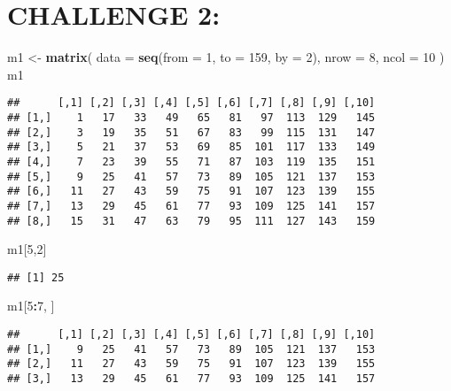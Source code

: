 \documentclass[]{article}
\newenvironment{Shaded}{\begin{snugshade}}{\end{snugshade}}
\newcommand{\KeywordTok}[1]{\textcolor[rgb]{0.13,0.29,0.53}{\textbf{#1}}}
\newcommand{\DataTypeTok}[1]{\textcolor[rgb]{0.13,0.29,0.53}{#1}}
\newcommand{\DecValTok}[1]{\textcolor[rgb]{0.00,0.00,0.81}{#1}}
\newcommand{\StringTok}[1]{\textcolor[rgb]{0.31,0.60,0.02}{#1}}
\newcommand{\OperatorTok}[1]{\textcolor[rgb]{0.81,0.36,0.00}{\textbf{#1}}}
\newcommand{\NormalTok}[1]{#1}
\begin{document}
\section{CHALLENGE 2:}\label{challenge-2}

\begin{Shaded}
\begin{Highlighting}[]
\NormalTok{m1 <-}\StringTok{ }\KeywordTok{matrix}\NormalTok{(}
  \DataTypeTok{data =} \KeywordTok{seq}\NormalTok{(}\DataTypeTok{from =} \DecValTok{1}\NormalTok{, }\DataTypeTok{to =} \DecValTok{159}\NormalTok{, }\DataTypeTok{by =} \DecValTok{2}\NormalTok{),}
  \DataTypeTok{nrow =} \DecValTok{8}\NormalTok{,}
  \DataTypeTok{ncol =} \DecValTok{10}
\NormalTok{)}
\NormalTok{m1}
\end{Highlighting}
\end{Shaded}

\begin{verbatim}
##      [,1] [,2] [,3] [,4] [,5] [,6] [,7] [,8] [,9] [,10]
## [1,]    1   17   33   49   65   81   97  113  129   145
## [2,]    3   19   35   51   67   83   99  115  131   147
## [3,]    5   21   37   53   69   85  101  117  133   149
## [4,]    7   23   39   55   71   87  103  119  135   151
## [5,]    9   25   41   57   73   89  105  121  137   153
## [6,]   11   27   43   59   75   91  107  123  139   155
## [7,]   13   29   45   61   77   93  109  125  141   157
## [8,]   15   31   47   63   79   95  111  127  143   159
\end{verbatim}

\begin{Shaded}
\begin{Highlighting}[]
\NormalTok{m1[}\DecValTok{5}\NormalTok{,}\DecValTok{2}\NormalTok{]}
\end{Highlighting}
\end{Shaded}

\begin{verbatim}
## [1] 25
\end{verbatim}

\begin{Shaded}
\begin{Highlighting}[]
\NormalTok{m1[}\DecValTok{5}\OperatorTok{:}\DecValTok{7}\NormalTok{, ]}
\end{Highlighting}
\end{Shaded}

\begin{verbatim}
##      [,1] [,2] [,3] [,4] [,5] [,6] [,7] [,8] [,9] [,10]
## [1,]    9   25   41   57   73   89  105  121  137   153
## [2,]   11   27   43   59   75   91  107  123  139   155
## [3,]   13   29   45   61   77   93  109  125  141   157
\end{verbatim}
\end{document}
